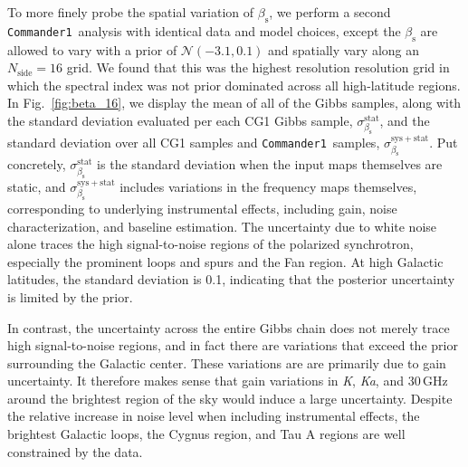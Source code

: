 \documentclass[twocolumn]{../../common/aa}
\def\commanderone{\texttt{Commander1}}
\newcommand{\K}[0]{\textit K}
\newcommand{\Ka}[0]{\textit{Ka}}
\begin{document}
To more finely probe the spatial variation of $\beta_\mathrm s$, we perform a second \commanderone\ analysis with identical data and model choices, except the $\beta_\mathrm s$ are allowed to vary with a prior of $\mathcal N(-3.1,0.1)$ and spatially vary along an $N_\mathrm{side}=16$ grid. We found that this was the highest resolution resolution grid in which the spectral index was not prior dominated across all high-latitude regions. In Fig.~\ref{fig:beta_16}, we display the mean of all of the Gibbs samples, along with the standard deviation evaluated per each CG1 Gibbs sample, $\sigma_{\beta_\mathrm s}^\mathrm{stat}$, and the standard deviation over all CG1 samples and \commanderone\ samples, $\sigma_{\beta_\mathrm s}^\mathrm{sys+stat}$. Put concretely, $\sigma_{\beta_\mathrm s}^\mathrm{stat}$ is the standard deviation when the input maps themselves are static, and $\sigma_{\beta_\mathrm s}^\mathrm{sys+stat}$ includes variations in the frequency maps themselves, corresponding to underlying instrumental effects, including gain, noise characterization, and baseline estimation. The uncertainty due to white noise alone  traces the high signal-to-noise regions of the polarized synchrotron, especially the prominent loops and spurs and the Fan region. At high Galactic latitudes, the standard deviation is 0.1, indicating that the posterior uncertainty is limited by the prior.

In contrast, the uncertainty across the entire Gibbs chain does not merely trace high signal-to-noise regions, and in fact there are variations that exceed the prior surrounding the Galactic center. These variations are are primarily due to gain uncertainty. It therefore makes sense that gain variations in \K, \Ka, and 30\,GHz around the brightest region of the sky would induce a large uncertainty. Despite the relative increase in noise level when including instrumental effects, the brightest Galactic loops, the Cygnus region, and Tau A regions are well constrained by the data.
\end{document}
